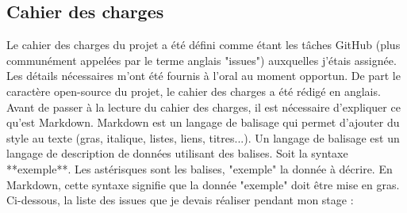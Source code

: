 \documentclass[12pt]{article}
\begin{document}
\subsection{Cahier des charges}
Le cahier des charges du projet a été défini comme étant les tâches GitHub (plus communément appelées par le terme anglais "issues") auxquelles j'étais assignée. Les détails nécessaires m'ont été fournis à l'oral au moment opportun. De part le caractère open-source du projet, le cahier des charges a été rédigé en anglais.
Avant de passer à la lecture du cahier des charges, il est nécessaire d'expliquer ce qu'est Markdown. Markdown est un langage de balisage qui permet d'ajouter du style au texte (gras, italique, listes, liens, titres...). Un langage de balisage est un langage de description de données utilisant des balises. Soit la syntaxe **exemple**. Les astérisques sont les balises, "exemple" la donnée à décrire. En Markdown, cette syntaxe signifie que la donnée "exemple" doit être mise en gras.
Ci-dessous, la liste des issues que je devais réaliser pendant mon stage :\\
\end{document}
